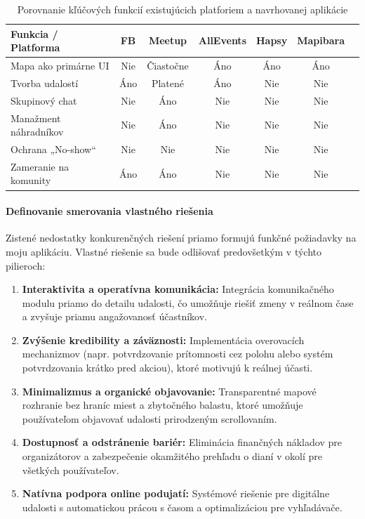 \begin{table}[h!]
\centering
\caption{Porovnanie kľúčových funkcií existujúcich platforiem a navrhovanej aplikácie}
\label{tab:comparison_market}
\begin{tabular}{|l|c|c|c|c|c|c|}
\hline
\textbf{Funkcia / Platforma} & \textbf{FB} & \textbf{Meetup} & \textbf{AllEvents} & \textbf{Hapsy} & \textbf{Mapibara} \\ \hline
Mapa ako primárne UI & Nie & Čiastočne & Áno & Áno & Áno \\ \hline
Tvorba udalostí & Áno & Platené & Áno & Nie & Nie \\ \hline
Skupinový chat & Nie & Áno & Nie & Nie & Nie \\ \hline
Manažment náhradníkov & Nie & Áno & Nie & Nie & Nie \\ \hline
Ochrana „No-show“ & Nie & Nie & Nie & Nie & Nie \\ \hline
Zameranie na komunity & Áno & Áno & Nie & Nie & Nie  \\ \hline
\end{tabular}
\end{table}


\paragraph{Definovanie smerovania vlastného riešenia}
Zistené nedostatky konkurenčných riešení priamo formujú funkčné požiadavky na moju aplikáciu. 
Vlastné riešenie sa bude odlišovať predovšetkým v týchto pilieroch:

\begin{enumerate}[noitemsep]
    \item \textbf{Interaktivita a operatívna komunikácia:} Integrácia komunikačného modulu priamo do detailu udalosti, čo umožňuje riešiť zmeny v reálnom čase a zvyšuje priamu angažovanosť účastníkov.
    \item \textbf{Zvýšenie kredibility a záväznosti:} Implementácia overovacích mechanizmov (napr. potvrdzovanie prítomnosti cez polohu alebo systém potvrdzovania krátko pred akciou), ktoré motivujú k reálnej účasti.
    \item \textbf{Minimalizmus a organické objavovanie:} Transparentné mapové rozhranie bez hraníc miest a zbytočného balastu, ktoré umožňuje používateľom objavovať udalosti prirodzeným scrollovaním.
    \item \textbf{Dostupnosť a odstránenie bariér:} Eliminácia finančných nákladov pre organizátorov a zabezpečenie okamžitého prehľadu o dianí v okolí pre všetkých používateľov.
    \item \textbf{Natívna podpora online podujatí:} Systémové riešenie pre digitálne udalosti s automatickou prácou s časom a optimalizáciou pre vyhľadávače.
\end{enumerate}

